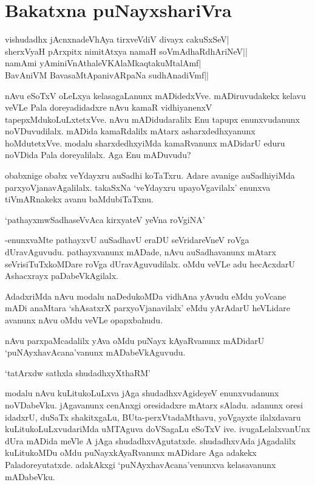 \chapter{Bakatxna puNayxshariVra}

\begin{shloka}
vishudadhx jAcnxnadeVhAya tirxveVdiV divayx cakuSxSeV|\\
sherxVyaH pArxpitx nimitAtxya namaH soVmAdhaRdhAriNeV||\\
namAmi yAminiVnAthaleVKAlaMkaqtakuMtalAmf|\\
BavAniVM BavasaMtApanivARpaNa sudhAnadiVmf||
\end{shloka}

nAvu eSoTxV oLeLxya kelasagaLanunx mADidedxVve. mADiruvudakekx kelavu veVLe Pala doreyadidadxre nAvu kamaR vidhiyanenxV tapepxMdukoLuLxtetxVve. nAvu mADidudaralilx Enu tapupx enunxvudanunx noVDuvudilalx. mADida kamaRdalilx mAtarx asharxdedhxyanunx hoMdutetxVve. modalu sharxdedhxyiMda kamaRvanunx mADidarU eduru noVDida Pala doreyalilalx. Aga Enu mADuvudu?

obabxnige obabx veYdayxru auSadhi koTaTxru. Adare avanige auSadhiyiMda parxyoVjanavAgalilalx. takaSxNa `veYdayxru upayoVgavilalx' enunxva tiVmARnakekx avanu baMdubiTaTxnu.

\begin{shloka}
`pathayxmwSadhaseVvAca kirxyateV yeVna roVgiNA' 
\end{shloka}

-enunxvaMte pathayxvU auSadhavU eraDU seVridareVneV roVga dUravAguvudu. pathayxvanunx mADade, nAvu auSadhavanunx mAtarx seVrisiTuTxkoMDare roVga dUravAguvudilalx. oMdu veVLe adu hecAcxdarU Ashacxrayx paDabeVkAgilalx.

AdadxriMda nAvu modalu naDedukoMDa vidhAna yAvudu eMdu yoVcane mADi anaMtara `shAsatxrX parxyoVjanavilalx' eMdu yArAdarU heVLidare avanunx nAvu oMdu veVLe opapxbahudu.

nAvu parxpaMcadalilx yAva oMdu puNayx kAyaRvanunx mADidarU `puNAyxhavAcana'vanunx mADabeVkAguvudu.

\begin{shloka}
`tatArxdw sathxla shudadhxyXthaRM'
\end{shloka}
 
modalu nAvu kuLitukoLuLxva jAga shudadhxvAgideyeV enunxvudanunx noVDabeVku. jAgavanunx cenAnxgi oresidadxre mAtarx sAladu. adanunx oresi idadxrU, duSaTx shakitxgaLu, BUta-perxVtadaMthavu, yoVgayxte ilalxdavaru kuLitukoLuLxvudariMda uMTAguva doVSagaLu eSoTxV ive. ivugaLelalxvanUnx dUra mADida meVle A jAga shudadhxvAgutatxde. shudadhxvAda jAgadalilx kuLitukoMDu oMdu puNayxkAyaRvanunx mADidare Aga adakekx Paladoreyutatxde. adakAkxgi `puNAyxhavAcana'venunxva kelasavanunx mADabeVku.

